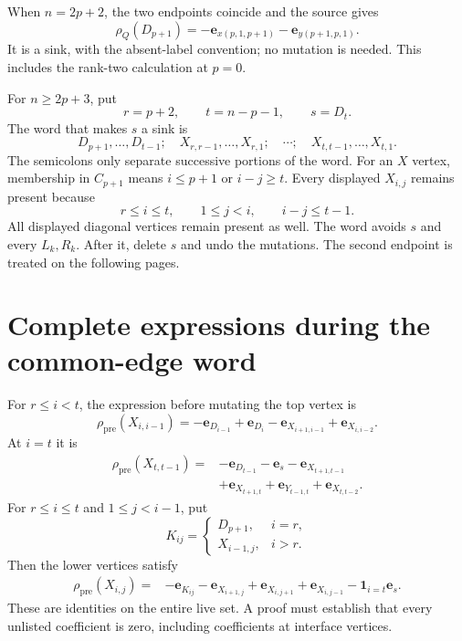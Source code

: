 \documentclass[11pt,a4paper]{article}
\newcommand{\e}{\mathbf e}
\begin{document}
When $n=2p+2$, the two endpoints coincide and the source gives
\[
 \rho_Q(D_{p+1})=-\e_{x(p,1,p+1)}-\e_{y(p+1,p,1)}.
\]
It is a sink, with the absent-label convention; no mutation is needed.
This includes the rank-two calculation at $p=0$.

For $n\ge2p+3$, put
\[
 r=p+2,\qquad t=n-p-1,\qquad s=D_t.
\]
The word that makes $s$ a sink is
\begin{equation}\label{eq:edge-word}
 D_{p+1},\ldots,D_{t-1};\quad
 X_{r,r-1},\ldots,X_{r,1};\quad\cdots;\quad
 X_{t,t-1},\ldots,X_{t,1}.
\end{equation}
The semicolons only separate successive portions of the word.
For an $X$ vertex, membership in $C_{p+1}$ means
$i\le p+1$ or $i-j\ge t$. Every displayed $X_{i,j}$ remains present because
\[
 r\le i\le t,\qquad 1\le j<i,\qquad i-j\le t-1.
\]
All displayed diagonal vertices remain present as well.
The word avoids $s$ and every $L_k,R_k$. After it, delete $s$ and undo
the mutations. The second endpoint is treated on the following pages.

\newpage
\section{Complete expressions during the common-edge word}
For $r\le i<t$, the expression before mutating the top vertex is
\begin{equation}\label{eq:top}
 \rho_{\mathrm{pre}}(X_{i,i-1})
 =-\e_{D_{i-1}}+\e_{D_i}-\e_{X_{i+1,i-1}}+\e_{X_{i,i-2}}.
\end{equation}
At $i=t$ it is
\begin{equation}\label{eq:last}
 \begin{split}
 \rho_{\mathrm{pre}}(X_{t,t-1})={}&-\e_{D_{t-1}}-\e_s-\e_{X_{t+1,t-1}}\\
 &+\e_{X_{t+1,t}}+\e_{Y_{t-1,t}}+\e_{X_{t,t-2}}.
 \end{split}
\end{equation}
For $r\le i\le t$ and $1\le j<i-1$, put
\[
 K_{ij}=\begin{cases}D_{p+1},&i=r,\\X_{i-1,j},&i>r.\end{cases}
\]
Then the lower vertices satisfy
\begin{equation}\label{eq:lower}
 \begin{split}
 \rho_{\mathrm{pre}}(X_{i,j})={}&-\e_{K_{ij}}-\e_{X_{i+1,j}}
       +\e_{X_{i,j+1}}+\e_{X_{i,j-1}}-\mathbf1_{i=t}\e_s.
 \end{split}
\end{equation}
These are identities on the entire live set. A proof must establish that
every unlisted coefficient is zero, including coefficients at interface vertices.
\end{document}
